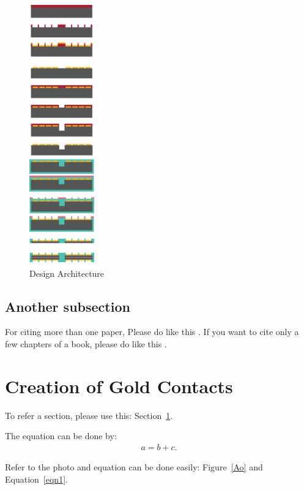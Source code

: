 \documentclass[12pt]{article}
\numberwithin{equation}{section}
\numberwithin{table}{section}
\numberwithin{figure}{section}
\begin{document}
\begin{figure} \centering
  \includegraphics[width=0.25\textwidth]{DesignArchitecture.png}
  \caption{Design Architecture}
  \label{DesignArchitecture}
\end{figure}


\subsection{Another subsection}

For citing more than one paper, Please do like this
\cite{article1,article2,article3}. If you want to cite only a few chapters of a book, please do like this
\cite[Chapters~1--3]{book1}.

\section{Creation of Gold Contacts} 
\label{label1}

To refer a section, please use this: Section~\ref{label1}.

The equation can be done by:
\begin{align} 
	a = b+c.
	\label{eqn1}
\end{align}

Refer to the photo and equation can be done easily: Figure~\ref{Ao} and Equation~\ref{eqn1}.
\end{document}
